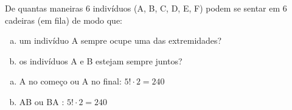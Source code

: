 \begin{ex}
De quantas maneiras 6 indivíduos (A, B, C, D, E, F) podem se sentar em 6 cadeiras (em fila) de modo que:
   \begin{enumerate}[(a)]
   \item um indivíduo A sempre ocupe uma das extremidades?
   \item os indivíduos A e B estejam sempre juntos?
   \end{enumerate}
     \begin{sol}
       \phantom{A}
         \begin{enumerate} [(a)]
             \item A no começo ou A no final: $5!\cdot2=240$  
             \item AB ou BA : $5!\cdot2=240$
         \end{enumerate}
     \end{sol}
\end{ex}